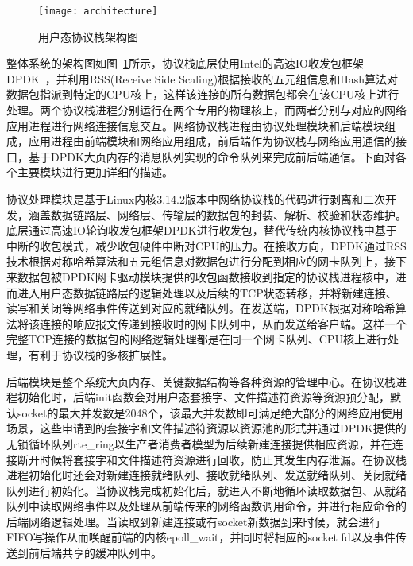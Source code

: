 \vspace{-10pt}
\begin{figure}[H] %
  \centering
  \texttt{[image: architecture]}
  \caption{用户态协议栈架构图}
  \label{fig:architecture}
\end{figure}
\vspace{-10pt}

整体系统的架构图如图~\ref{fig:architecture}所示，协议栈底层使用Intel的高速IO收发包框架DPDK~\cite{DPDK}，并利用RSS(Receive Side Scaling)根据接收的五元组信息和Hash算法对数据包指派到特定的CPU核上，这样该连接的所有数据包都会在该CPU核上进行处理。两个协议栈进程分别运行在两个专用的物理核上，而两者分别与对应的网络应用进程进行网络连接信息交互。网络协议栈进程由协议处理模块和后端模块组成，应用进程由前端模块和网络应用组成，前后端作为协议栈与网络应用通信的接口，基于DPDK大页内存的消息队列实现的命令队列来完成前后端通信。下面对各个主要模块进行更加详细的描述。

协议处理模块是基于Linux内核3.14.2版本中网络协议栈的代码进行剥离和二次开发，涵盖数据链路层、网络层、传输层的数据包的封装、解析、校验和状态维护。底层通过高速IO轮询收发包框架DPDK进行收发包，替代传统内核协议栈中基于中断的收包模式，减少收包硬件中断对CPU的压力。在接收方向，DPDK通过RSS技术根据对称哈希算法和五元组信息对数据包进行分配到相应的网卡队列上，接下来数据包被DPDK网卡驱动模块提供的收包函数接收到指定的协议栈进程核中，进而进入用户态数据链路层的逻辑处理以及后续的TCP状态转移，并将新建连接、读写和关闭等网络事件传送到对应的就绪队列。在发送端，DPDK根据对称哈希算法将该连接的响应报文传递到接收时的网卡队列中，从而发送给客户端。这样一个完整TCP连接的数据包的网络逻辑处理都是在同一个网卡队列、CPU核上进行处理，有利于协议栈的多核扩展性。

后端模块是整个系统大页内存、关键数据结构等各种资源的管理中心。在协议栈进程初始化时，后端init函数会对用户态套接字、文件描述符资源等资源预分配，默认socket的最大并发数是2048个，该最大并发数即可满足绝大部分的网络应用使用场景，这些申请到的套接字和文件描述符资源以资源池的形式并通过DPDK提供的无锁循环队列rte\_ring以生产者消费者模型为后续新建连接提供相应资源，并在连接断开时候将套接字和文件描述符资源进行回收，防止其发生内存泄漏。在协议栈进程初始化时还会对新建连接就绪队列、接收就绪队列、发送就绪队列、关闭就绪队列进行初始化。当协议栈完成初始化后，就进入不断地循环读取数据包、从就绪队列中读取网络事件以及处理从前端传来的网络函数调用命令，并进行相应命令的后端网络逻辑处理。当读取到新建连接或有socket新数据到来时候，就会进行FIFO写操作从而唤醒前端的内核epoll\_wait，并同时将相应的socket fd以及事件传送到前后端共享的缓冲队列中。

